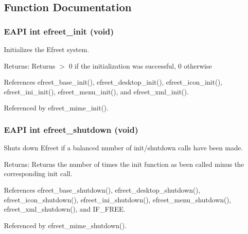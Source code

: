 \subsection{Function Documentation}
\subsubsection{\setlength{\rightskip}{0pt plus 5cm}EAPI int efreet\_\-init (void)}\label{efreet_8c_448e550a87271c7a74f8bf9963a8b81e}


Initializes the Efreet system. 

\begin{Desc}
\item[Returns:]Returns $>$ 0 if the initialization was successful, 0 otherwise \end{Desc}


References efreet\_\-base\_\-init(), efreet\_\-desktop\_\-init(), efreet\_\-icon\_\-init(), efreet\_\-ini\_\-init(), efreet\_\-menu\_\-init(), and efreet\_\-xml\_\-init().

Referenced by efreet\_\-mime\_\-init().
\subsubsection{\setlength{\rightskip}{0pt plus 5cm}EAPI int efreet\_\-shutdown (void)}\label{efreet_8c_21312e3804b2ff4afed2e854b66ed827}


Shuts down Efreet if a balanced number of init/shutdown calls have been made. 

\begin{Desc}
\item[Returns:]Returns the number of times the init function as been called minus the corresponding init call. \end{Desc}


References efreet\_\-base\_\-shutdown(), efreet\_\-desktop\_\-shutdown(), efreet\_\-icon\_\-shutdown(), efreet\_\-ini\_\-shutdown(), efreet\_\-menu\_\-shutdown(), efreet\_\-xml\_\-shutdown(), and IF\_\-FREE.

Referenced by efreet\_\-mime\_\-shutdown().